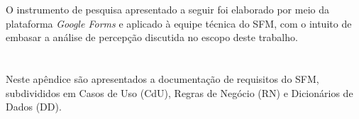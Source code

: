 \section*{}

O instrumento de pesquisa apresentado a seguir foi elaborado por meio da plataforma \textit{Google Forms} e aplicado à equipe técnica do SFM, com o intuito de embasar a análise de percepção discutida no escopo deste trabalho.



\section*{}

Neste apêndice são apresentados a documentação de requisitos do SFM, subdivididos em Casos de Uso (CdU), Regras de Negócio (RN) e Dicionários de Dados (DD).

\vspace{10pt}
\vspace{10pt}


